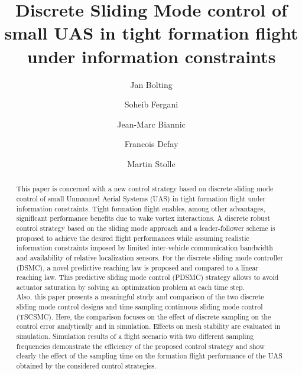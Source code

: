 \documentclass{ifacconf}
\begin{document}
\begin{frontmatter}

\title{Discrete Sliding Mode control of small UAS in tight formation flight under information constraints}

\author[First]{Jan Bolting}
\author[First]{Soheib Fergani}
\author[Second]{Jean-Marc Biannic}
\author[First]{Francois Defay}
\author[Second]{Martin Stolle}

\address[First]{Institut Supérieur de l'Aéronautique et de l'Espace (ISAE),
   31055 Toulouse, France (e-mail: jan.bolting@isae.fr, soheib.fergani@isae.fr, francois.defay@isae.fr)}
\address[Second]{Office National d'Études et de Recherches Aérospatiales (ONERA),
   31055 Toulouse, France (e-mail: jean-marc.biannic@onera.fr, martin.stolle@onera.fr)}
   

\begin{abstract}
This paper is concerned with a new control strategy  based on discrete sliding mode control of small Unmanned Aerial Systems (UAS) in tight formation flight under information constraints. 
Tight formation flight enables, among other advantages, significant performance benefits due to wake vortex interactions. 
A discrete robust control strategy based on the sliding mode approach and a leader-follower scheme is proposed to achieve the desired flight performances while assuming realistic information constraints imposed by limited inter-vehicle communication bandwidth and availability of relative localization sensors.
For the discrete sliding mode controller (DSMC), a novel predictive reaching law is proposed and compared to a linear reaching law. This predictive sliding mode control (PDSMC) strategy allows to avoid actuator saturation by solving an optimization problem at each time step.\\
Also, this paper presents a meaningful study and comparison of the two discrete sliding mode control designs and  time sampling continuous sliding mode control (TSCSMC). 
Here, the comparison focuses on the effect of discrete sampling on the control error analytically and in simulation. Effects on mesh stability are evaluated in simulation.
Simulation results of a flight scenario with two different sampling frequencies demonstrate the efficiency of the proposed control strategy and show clearly the effect of the sampling time on the formation flight performance of the UAS obtained by the considered control strategies.


\end{abstract}
\end{frontmatter}
\end{document}
